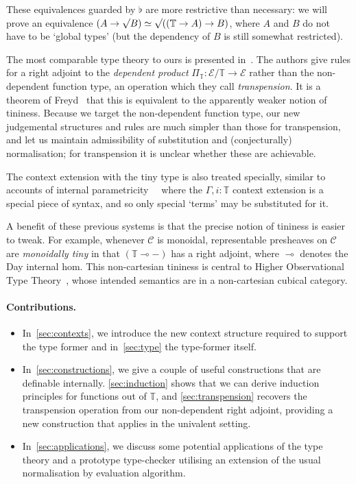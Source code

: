 \documentclass[10pt]{article}
\theoremstyle{definition}
\renewcommand{\equiv}{\simeq}
\newcommand*{\lolli}{\multimap}
\newcommand{\Tiny}{\mathbb{T}}
\newcommand{\rformsym}{\surd}
\newcommand{\rformu}[1]{\ThisStyle{\raisebox{0.07em}{$\SavedStyle \rformsym$}} #1}
\newcommand{\C}{\mathcal{C}}
\begin{document}
These equivalences guarded by $\flat$ are more restrictive than
necessary: we will prove an equivalence
${(A \to \rformu B) \equiv \rformu ((\Tiny \to A) \to B)}$, where $A$
and $B$ do not have to be `global types' (but the dependency of $B$ is
still somewhat restricted).

The most comparable type theory to ours is presented
in~\cite{transpension}. The authors give rules for a right adjoint to
the \emph{dependent product}
$\Pi_\Tiny : \mathcal{E}/\Tiny \to \mathcal{E}$ rather than the
non-dependent function type, an operation which they call
\emph{transpension}. It is a theorem of Freyd~\cite[Proposition
1.2]{yetter:tiny} that this is equivalent to the apparently weaker
notion of tininess. Because we target the non-dependent function type,
our new judgemental structures and rules are much simpler than those
for transpension, and let us maintain admissibility of substitution
and (conjecturally) normalisation; for transpension it is unclear
whether these are achievable.

The context extension with the tiny type is also treated specially,
similar to accounts of internal
parametricity~\cite{cavallo-harper:parametricity-for-ctt,
  cavallo:thesis}~\cite[Section 5]{fitchtt} where the
$\Gamma, i : \Tiny$ context extension is a special piece of syntax,
and so only special `terms' may be substituted for it.

A benefit of these previous systems is that the precise notion of
tininess is easier to tweak. For example, whenever $\C$ is monoidal,
representable presheaves on $\C$ are \emph{monoidally tiny} in that
$(\Tiny \lolli -)$ has a right adjoint, where $\lolli$ denotes the Day
internal hom. This non-cartesian tininess is central to Higher
Observational Type Theory~\cite{mike:observational-day3}, whose
intended semantics are in a non-cartesian cubical category.

\paragraph{Contributions.}

\begin{itemize}
\item In~\cref{sec:contexts}, we introduce the new context structure
  required to support the type former and in~\cref{sec:type} the
  type-former itself.
\item In~\cref{sec:constructions}, we give a couple of useful
  constructions that are definable internally. \cref{sec:induction}
  shows that we can derive induction principles for functions out of
  $\Tiny$, and \cref{sec:transpension} recovers the transpension
  operation from our non-dependent right adjoint, providing a new
  construction that applies in the univalent setting.
\item In~\cref{sec:applications}, we discuss some potential
  applications of the type theory and a prototype type-checker
  utilising an extension of the usual normalisation by evaluation
  algorithm.
\end{itemize}
\end{document}
